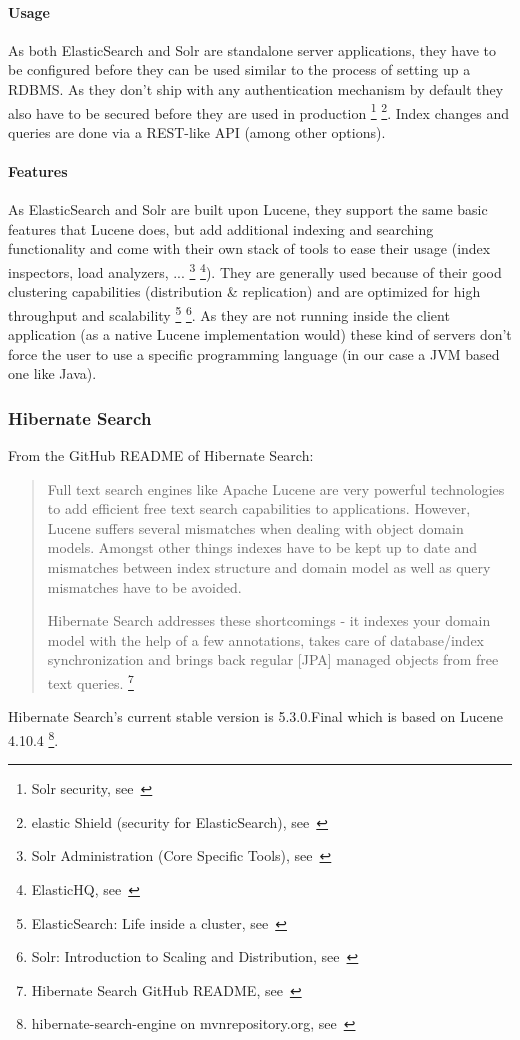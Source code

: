 \paragraph{Usage}
As both ElasticSearch and Solr are standalone server applications, they have to be configured before they can be used similar to the process of setting up a RDBMS. As they don't ship with any authentication mechanism by default they also have to be secured before they are used in production \footnote{Solr security, see~\cite{solr_security}} \footnote{elastic Shield (security for ElasticSearch), see~\cite{elasticsearch_security}}. Index changes and queries are done via a REST-like API (among other options).

\paragraph{Features}
As ElasticSearch and Solr are built upon Lucene, they support the same basic features that Lucene does, but add additional indexing and searching functionality and come with their own stack of tools to ease their usage (index inspectors, load analyzers, ... \footnote{Solr Administration (Core Specific Tools), see~\cite{solr_admin}} \footnote{ElasticHQ, see~\cite{elasticsearch_admin}}). They are generally used because of their good clustering capabilities (distribution \& replication) and are optimized for high throughput and scalability \footnote{ElasticSearch: Life inside a cluster, see~\cite{elasticsearch_clustering}} \footnote{Solr: Introduction to Scaling and Distribution, see~\cite{solr_clustering}}. As they are not running inside the client application (as a native Lucene implementation would) these kind of servers don't force the user to use a specific programming language (in our case a JVM based one like Java).

\pagebreak

\subsubsection{Hibernate Search}

From the GitHub README of Hibernate Search:
\begin{quote}
Full text search engines like Apache Lucene are very powerful technologies to add efficient free text search capabilities to applications. However, Lucene suffers several mismatches when dealing with object domain models. Amongst other things indexes have to be kept up to date and mismatches between index structure and domain model as well as query mismatches have to be avoided.

Hibernate Search addresses these shortcomings - it indexes your domain model with the help of a few annotations, takes care of database/index synchronization and brings back regular [JPA] managed objects from free text queries. \footnote{Hibernate Search GitHub README, see~\cite{hsearch_source_code_git}}
\end{quote}
\noindent
Hibernate Search's current stable version is 5.3.0.Final which is based on Lucene 4.10.4 \footnote{hibernate-search-engine on mvnrepository.org, see~\cite{hibernate_search_engine_mvnrepository}}.


